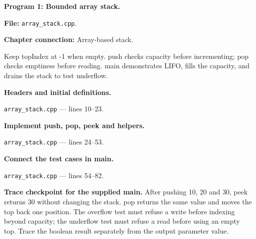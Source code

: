 \textbf{Program 1: Bounded array stack.}

\textbf{File:} \texttt{array\_stack.cpp}.

\textbf{Chapter connection:} Array-based stack.

Keep topIndex at -1 when empty. push checks capacity before incrementing; pop checks emptiness before reading. main demonstrates LIFO, fills the capacity, and drains the stack to test underflow.



\begin{utpsteps}\setcounter{enumi}{0}\item \textbf{Headers and initial definitions.}\end{utpsteps}

\texttt{array\_stack.cpp} --- lines 10--23.




\tcbbreak

\begin{utpsteps}\setcounter{enumi}{1}\item \textbf{Implement push, pop, peek and helpers.}\end{utpsteps}

\texttt{array\_stack.cpp} --- lines 24--53.






\tcbbreak

\begin{utpsteps}\setcounter{enumi}{2}\item \textbf{Connect the test cases in main.}\end{utpsteps}

\texttt{array\_stack.cpp} --- lines 54--82.

\textbf{Trace checkpoint for the supplied main.} After pushing 10, 20 and 30, peek returns 30 without changing the stack. pop returns the same value and moves the top back one position. The overflow test must refuse a write before indexing beyond capacity; the underflow test must refuse a read before using an empty top. Trace the boolean result separately from the output parameter value.




\tcbbreak

